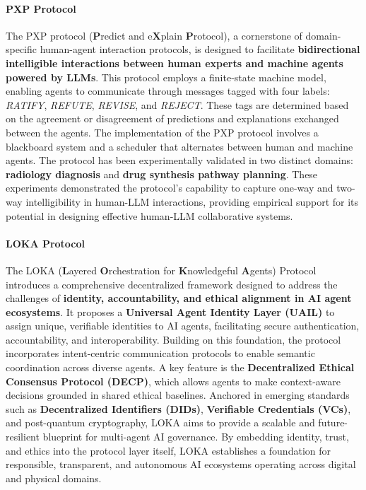 \documentclass[10pt,preprint]{article}
\begin{document}
\paragraph{PXP Protocol~\citep{srinivasan2024implementationapplicationintelligibilityprotocol}} The PXP protocol (\textbf{P}redict and e\textbf{X}plain \textbf{P}rotocol), a cornerstone of domain-specific human-agent interaction protocols, is designed to facilitate \textbf{bidirectional intelligible interactions between human experts and machine agents powered by LLMs}. This protocol employs a finite-state machine model, enabling agents to communicate through messages tagged with four labels: \textit{RATIFY}, \textit{REFUTE}, \textit{REVISE}, and \textit{REJECT}. These tags are determined based on the agreement or disagreement of predictions and explanations exchanged between the agents. The implementation of the PXP protocol involves a blackboard system and a scheduler that alternates between human and machine agents. The protocol has been experimentally validated in two distinct domains: \textbf{radiology diagnosis} and \textbf{drug synthesis pathway planning}. These experiments demonstrated the protocol's capability to capture one-way and two-way intelligibility in human-LLM interactions, providing empirical support for its potential in designing effective human-LLM collaborative systems.


\paragraph{LOKA Protocol~\citep{ranjan2025lokaprotocoldecentralizedframework}} The LOKA (\textbf{L}ayered \textbf{O}rchestration for \textbf{K}nowledgeful \textbf{A}gents) Protocol introduces a comprehensive decentralized framework designed to address the challenges of \textbf{identity, accountability, and ethical alignment in AI agent ecosystems}. It proposes a \textbf{Universal Agent Identity Layer (UAIL)} to assign unique, verifiable identities to AI agents, facilitating secure authentication, accountability, and interoperability. Building on this foundation, the protocol incorporates intent-centric communication protocols to enable semantic coordination across diverse agents. A key feature is the \textbf{Decentralized Ethical Consensus Protocol (DECP)}, which allows agents to make context-aware decisions grounded in shared ethical baselines. Anchored in emerging standards such as \textbf{Decentralized Identifiers (DIDs)}, \textbf{Verifiable Credentials (VCs)}, and post-quantum cryptography, LOKA aims to provide a scalable and future-resilient blueprint for multi-agent AI governance. By embedding identity, trust, and ethics into the protocol layer itself, LOKA establishes a foundation for responsible, transparent, and autonomous AI ecosystems operating across digital and physical domains.
\end{document}
